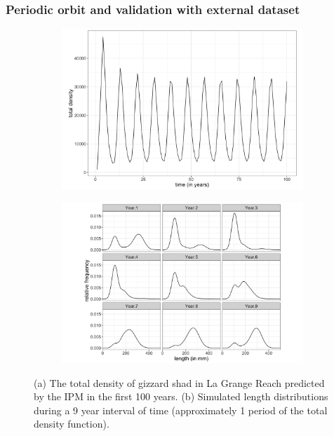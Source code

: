 \documentclass[preprint,review,12pt,authoryear]{elsarticle}
\begin{document}
\subsubsection{Periodic orbit and validation with external dataset}
\begin{figure}
\centering
\begin{subfigure}[b]{.45\textwidth}
  \includegraphics[width=\textwidth]{figures/ntotal.png}
   \caption{}
  \label{fig:ntotal}
\end{subfigure}
\begin{subfigure}[b]{.45\textwidth}
 \includegraphics[width=\textwidth]{figures/period_facet.png}
     \caption{}
\label{fig:period}
\end{subfigure}
\caption{(a) The total density of gizzard shad in La Grange Reach predicted by the IPM in the first 100 years. (b) Simulated length distributions during a 9 year interval of time (approximately 1 period of the total density function).}
\end{figure}    
\end{document}
